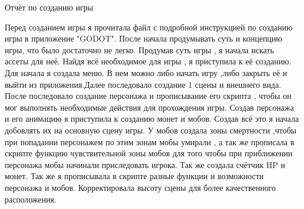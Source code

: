                                                                      Отчёт по созданию игры

Перед созданием игры я прочитала файл с подробной инструкцией по созданию игры в приложение "GODOT".
После начала продумывать суть и концепцию игры, что было достаточно не легко. Продумав суть игры , я начала искать ассеты для неё.
Найдя всё необходимое для игры , я приступила к её созданию. Для начала я создала меню. В нем можно либо начать игру ,либо закрыть её и выйти из приложения.Далее последовало создание 1 сцены и внешнего вида. После последовало создание персонажа и прописывание его скрипта , чтобы он мог выполнять необходимые действия для прохождения игры. Создав персонажа и его анимацию я приступила к созданию монет и мобов. Создав всё это я начала добовлять их на основную сцену игры. У мобов создала зоны смертности ,чтобы при попадании персонажем по этим зонам мобы умирали , а так же прописала в скрипте функцию чувствительной зоны мобов для того чтобы при приближении персонажа мобы начинали приследовать игрока. Так же создала счётчик HP и монет. Так же я прописывала в скрипте разные функции и возможности персонажа и мобов. Корректировала высоту сцены для более качественного расположения.
